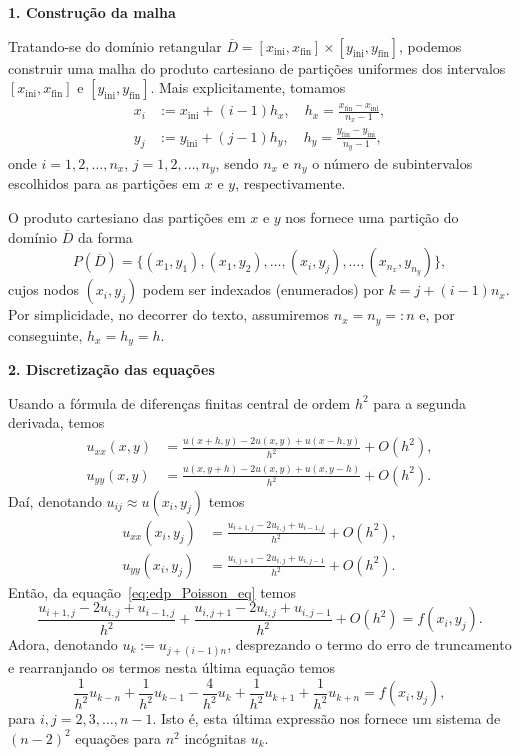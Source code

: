 \begin{flushleft}
  {\bf 1. Construção da malha}
\end{flushleft}

Tratando-se do domínio retangular $\overline{D} = [x_{\text{ini}}, x_{\text{fin}}]\times [y_{\text{ini}}, y_{\text{fin}}]$, podemos construir uma malha do produto cartesiano de partições uniformes dos intervalos $[x_{\text{ini}}, x_{\text{fin}}]$ e $[y_{\text{ini}}, y_{\text{fin}}]$. Mais explicitamente, tomamos
\begin{align}
  x_{i} &:= x_{\text{ini}} + (i-1)h_x,\quad h_x = \frac{x_{\text{fin}}-x_{\text{ini}}}{n_x-1},\\
  y_{j} &:= y_{\text{ini}} + (j-1)h_y,\quad h_y = \frac{y_{\text{fin}}-y_{\text{ini}}}{n_y-1},  
\end{align}
onde $i = 1, 2, \dotsc, n_x$, $j = 1, 2, \dotsc, n_y$, sendo $n_x$ e $n_y$ o número de subintervalos escolhidos para as partições em $x$ e $y$, respectivamente.

O produto cartesiano das partições em $x$ e $y$ nos fornece uma partição do domínio $\overline{D}$ da forma
\begin{equation}
  P(\overline{D}) = \{(x_1, y_1), (x_1, y_2), \dotsc, (x_i, y_j), \dotsc, (x_{n_x}, y_{n_y})\},
\end{equation}
cujos nodos $(x_i, y_j)$ podem ser indexados (enumerados) por $k = j + (i-1)n_x$.  Por simplicidade, no decorrer do texto, assumiremos $n_x=n_y=:n$ e, por conseguinte, $h_x=h_y=h$.

\begin{flushleft}
  {\bf 2. Discretização das equações}
\end{flushleft}

Usando a fórmula de diferenças finitas central de ordem $h^2$ para a segunda derivada, temos
\begin{align}
  u_{xx}(x,y) &= \frac{u(x+h,y)-2u(x,y)+u(x-h,y)}{h^2} + O(h^2),\\
  u_{yy}(x,y) &= \frac{u(x,y+h)-2u(x,y)+u(x,y-h)}{h^2} + O(h^2).
\end{align}
Daí, denotando $u_{ij}\approx u(x_i, y_j)$ temos
\begin{align}
  u_{xx}(x_i,y_j) &= \frac{u_{i+1,j}-2u_{i,j}+u_{i-1,j}}{h^2} + O(h^2),\\
  u_{yy}(x_i,y_j) &= \frac{u_{i,j+1}-2u_{i,j}+u_{i,j-1}}{h^2} + O(h^2).  
\end{align}
Então, da equação~\ref{eq:edp_Poisson_eq} temos
\begin{equation}
  \frac{u_{i+1,j}-2u_{i,j}+u_{i-1,j}}{h^2} + \frac{u_{i,j+1}-2u_{i,j}+u_{i,j-1}}{h^2} + O(h^2) = f(x_i,y_j).
\end{equation}
Adora, denotando $u_k := u_{j+(i-1)n}$, desprezando o termo do erro de truncamento e rearranjando os termos nesta última equação temos
\begin{equation}\label{eq:edp_Poisson_mdf_sis0}
  \frac{1}{h^2}u_{k-n} + \frac{1}{h^2}u_{k-1} -\frac{4}{h^2}u_{k} + \frac{1}{h^2}u_{k+1} + \frac{1}{h^2}u_{k+n} = f(x_i,y_j),
\end{equation}
para $i,j=2, 3, \dotsc, n-1$. Isto é, esta última expressão nos fornece um sistema de $(n-2)^2$ equações para $n^2$ incógnitas $u_k$.

